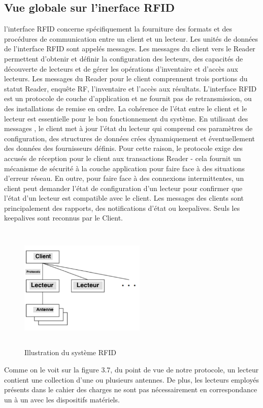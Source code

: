 \documentclass[11pt, a4paper, twoside]{book}
\begin{document}
\subsection{Vue globale sur l'inerface RFID}
l'interface RFID concerne spécifiquement la fourniture des formats et des procédures de communication entre un client et un lecteur. Les unités de données de l'interface RFID sont appelés messages. Les messages du client vers le Reader permettent d'obtenir et définir la configuration des lecteurs, des capacités de découverte de lecteurs et de gérer les opérations d'inventaire et d'accès aux lecteurs. Les messages du Reader pour le client comprennent trois portions du statut Reader, enquête RF, l'inventaire et l'accès aux résultats. L'interface RFID est un protocole de couche d'application et ne fournit pas de retransmission, ou des installations de remise en ordre. La cohérence de l'état entre le client et le lecteur est essentielle pour le bon fonctionnement du système. En utilisant des messages , le client met à jour l'état du lecteur qui comprend ces paramètres de configuration, des structures de données crées dynamiquement et éventuellement des données des fournisseurs définis. Pour cette raison, le protocole exige des accusés de réception pour le client aux transactions Reader - cela fournit un mécanisme de sécurité à la couche application pour faire face à des situations d'erreur réseau. En outre, pour faire face à des connexions intermittentes, un client peut demander l'état de configuration d'un lecteur pour confirmer que l'état d'un lecteur est compatible avec le client. Les messages des clients sont principalement des rapports, des notifications d'état ou keepalives. Seuls les keepalives sont reconnus par le Client.
\begin{figure}[!h]
\centering
\includegraphics[width=6cm,height=6cm]{lim}
\caption{Illustration du système RFID}
\end{figure}
Comme on le voit sur la figure 3.7, du point de vue de notre protocole, un lecteur contient une collection d'une ou plusieurs antennes. De plus, les lecteurs employés présents dans le cahier des charges ne sont pas nécessairement en correspondance un à un avec les dispositifs matériels.
\end{document}
